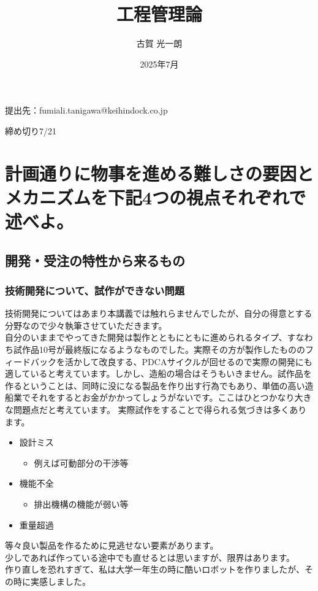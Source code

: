 \documentclass[dvipdfmx,a4paper]{jsarticle}
\title{工程管理論}
\author{古賀 光一朗}
\date{2025年7月}
\begin{document}
\maketitle
提出先：fumiali.tanigawa@keihindock.co.jp


締め切り7/21


\section{計画通りに物事を進める難しさの要因とメカニズムを下記4つの視点それぞれで述べよ。}
\subsection{開発・受注の特性から来るもの}
\subsubsection{技術開発について、試作ができない問題}
技術開発についてはあまり本講義では触れらませんでしたが、自分の得意とする分野なので少々執筆させていただきます。\\
自分のいままでやってきた開発は製作とともにともに進められるタイプ、すなわち試作品10号が最終版になるようなものでした。実際その方が製作したもののフィードバックを活かして改良する、PDCAサイクルが回せるので実際の開発にも適していると考えています。しかし、造船の場合はそうもいきません。試作品を作るということは、同時に没になる製品を作り出す行為でもあり、単価の高い造船業でそれをするとお金がかかってしょうがないです。ここはひとつかなり大きな問題点だと考えています。
実際試作をすることで得られる気づきは多くあります。
\begin{itemize}
    \item 設計ミス
    \begin{itemize}
        \item 例えば可動部分の干渉等
    \end{itemize}
    \item 機能不全
    \begin{itemize}
        \item 排出機構の機能が弱い等
    \end{itemize}
    \item 重量超過
\end{itemize}
等々良い製品を作るために見逃せない要素があります。\\
少しであれば作っている途中でも直せるとは思いますが、限界はあります。\\
作り直しを恐れすぎて、私は大学一年生の時に酷いロボットを作りましたが、その時に実感しました。
\end{document}
